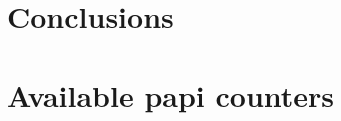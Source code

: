 \documentclass[a4paper]{report}
\begin{document}
\chapter{Conclusions}

\appendix

\chapter{Available papi counters}\label{A:papi_avail}

\end{document}
